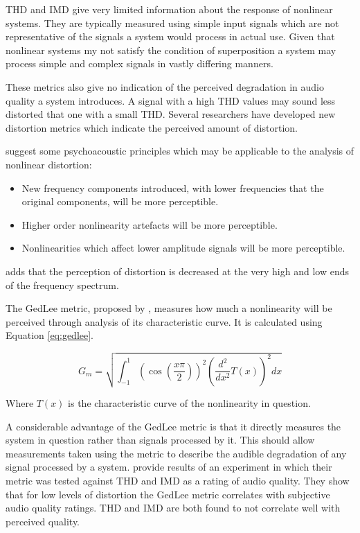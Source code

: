 		THD and IMD give very limited information about the response of nonlinear systems. They are typically
		measured using simple input signals which are not representative of the signals a system would process in
		actual use. Given that nonlinear systems my not satisfy the condition of superposition a system may process
		simple and complex signals in vastly differing manners. 

		These metrics also give no indication of the perceived degradation in audio quality a system introduces. A
		signal with a high THD values may sound less distorted that one with a small THD. Several researchers have
		developed new distortion metrics which indicate the perceived amount of distortion.

		\citet{geddes2003auditory} suggest some psychoacoustic principles which may be applicable to the analysis of
		nonlinear distortion:

		\begin{itemize}
			\item New frequency components introduced, with lower frequencies that the original components, will
			      be more perceptible.
			\item Higher order nonlinearity artefacts will be more perceptible.
			\item Nonlinearities which affect lower amplitude signals will be more perceptible.
		\end{itemize}

		\citet{voishvillo2006assessment} adds that the perception of distortion is decreased at the very high and
		low ends of the frequency spectrum.

		The GedLee metric, proposed by \citet{geddes2003auditory}, measures how much a nonlinearity will be
		perceived through analysis of its characteristic curve. It is calculated using Equation \ref{eq:gedlee}.

		\begin{equation}
			G_{m} = \sqrt{\int_{-1}^{1} \left( \cos \left( \frac{x\pi}{2} \right) \right)^{2}
				      \left( \frac{d^{2}}{dx^{2}} T(x) \right)^{2} dx}
			\label{eq:gedlee}
		\end{equation}

		Where $T(x)$ is the characteristic curve of the nonlinearity in question.

		A considerable advantage of the GedLee metric is that it directly measures the system in question rather
		than signals processed by it. This should allow measurements taken using the metric to describe the audible
		degradation of any signal processed by a system. \citet{lee2003auditory} provide results of an experiment in
		which their metric was tested against THD and IMD as a rating of audio quality. They show that for low
		levels of distortion the GedLee metric correlates with subjective audio quality ratings. THD and IMD are
		both found to not correlate well with perceived quality.

